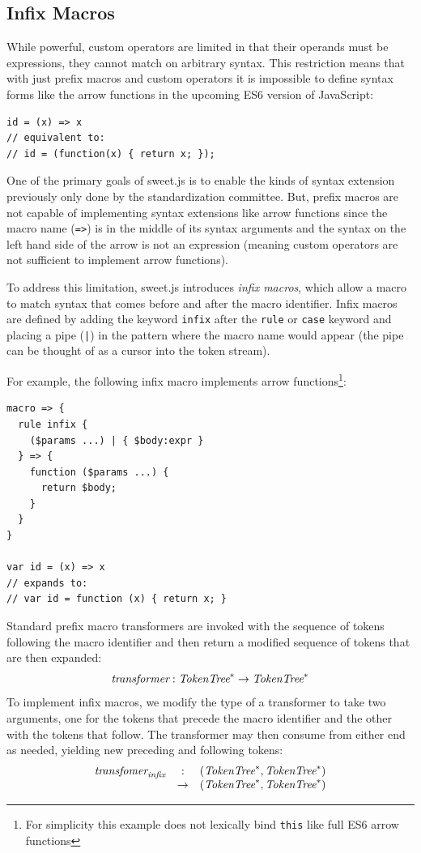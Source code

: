 \documentclass[preprint,10pt]{sigplanconf}
\begin{document}
\subsection{Infix Macros}
\label{sec:infix}
While powerful, custom operators are limited in that their operands
must be expressions, they cannot match on arbitrary syntax.
This restriction means that with just prefix macros and custom
operators it is impossible to define syntax forms like the arrow
functions in the upcoming ES6 version of JavaScript:

\begin{lstlisting}
id = (x) => x
// equivalent to:
// id = (function(x) { return x; });
\end{lstlisting}

One of the primary goals of sweet.js is to enable the kinds of syntax
extension previously only done by the standardization committee. But,
prefix macros are not capable of implementing syntax extensions like
arrow functions since the macro name (\verb!=>!) is in the middle of
its syntax arguments and the syntax on the left hand side of the arrow
is not an expression (meaning custom operators are not sufficient to
implement arrow functions).

To address this limitation, sweet.js introduces \emph{infix macros},
which allow a macro to match syntax that comes before and after the macro
identifier. Infix macros are defined by adding the keyword
\verb!infix! after the \verb!rule! or \verb!case!
keyword and placing a pipe (\verb!|!) in the pattern where the
macro name would appear (the pipe can be thought of as a cursor into
the token stream).

For example, the following infix macro implements arrow
functions\footnote{For simplicity this example does not lexically bind
  \verb!this! like full ES6 arrow functions}:
\begin{lstlisting}
macro => {
  rule infix {
    ($params ...) | { $body:expr }
  } => {
    function ($params ...) {
      return $body; 
    }
  }
}

var id = (x) => x
// expands to:
// var id = function (x) { return x; }
\end{lstlisting}


Standard prefix macro transformers are invoked with the sequence of
tokens following the macro identifier and then return a modified
sequence of tokens that are then expanded:
\[
\textit{transformer} : \textit{TokenTree}^* \rightarrow \textit{TokenTree}^*
\]
To implement infix macros, we modify the type of a transformer to
take two arguments, one for the tokens that precede the macro
identifier and the other with the tokens that follow. The transformer
may then consume from either end as needed, yielding new preceding
and following tokens:
\[
\begin{array}{rcl}
  \textit{transfomer}_{\textit{infix}} &:& (\textit{TokenTree}^*, \textit{TokenTree}^*) 
  \\
  &\rightarrow& (\textit{TokenTree}^*, \textit{TokenTree}^*)
\end{array}
\]
\end{document}
